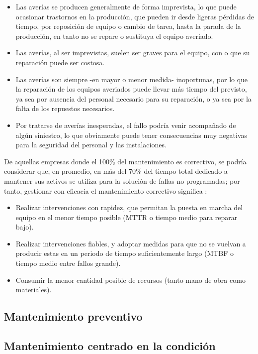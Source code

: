 \begin{itemize}
\item Las averías se producen generalmente de forma imprevista, lo que puede ocasionar trastornos en la producción, que pueden ir desde ligeras pérdidas de tiempo, por reposición de equipo o cambio de tarea, hasta la parada de la producción, en tanto no se repare o sustituya el equipo averiado.
\item Las averías, al ser imprevistas, suelen ser graves para el equipo, con o que su reparación puede ser costosa.
\item Las averías son siempre -en mayor o menor medida- inoportunas, por lo que la reparación de los equipos averiados puede llevar más tiempo del previsto, ya sea por ausencia del personal necesario para su reparación, o ya sea por la falta de los repuestos necesarios.
\item Por tratarse de averías inesperadas, el fallo podría venir acompañado de algún siniestro, lo que obviamente puede tener consecuencias muy negativas para la seguridad del personal y las instalaciones.
\end{itemize}

De aquellas empresas donde el 100\% del mantenimiento es correctivo, se podría considerar que, en promedio, en más del 70\% del tiempo total dedicado a mantener sus activos se utiliza para la solución de fallas no programadas; por tanto, gestionar con eficacia el mantenimiento correctivo significa \citep{garcia2010}:

\begin{itemize}
\item Realizar intervenciones con rapidez, que permitan la puesta en marcha del equipo en el menor tiempo posible (MTTR o tiempo medio para reparar bajo).
\item Realizar intervenciones fiables, y adoptar medidas para que no se vuelvan a producir estas en un periodo de tiempo suficientemente largo (MTBF o tiempo medio entre fallos grande).
\item Consumir la menor cantidad posible de recursos (tanto mano de obra como materiales).
\end{itemize}

\subsection{Mantenimiento preventivo}

\subsection{Mantenimiento centrado en la condición}

